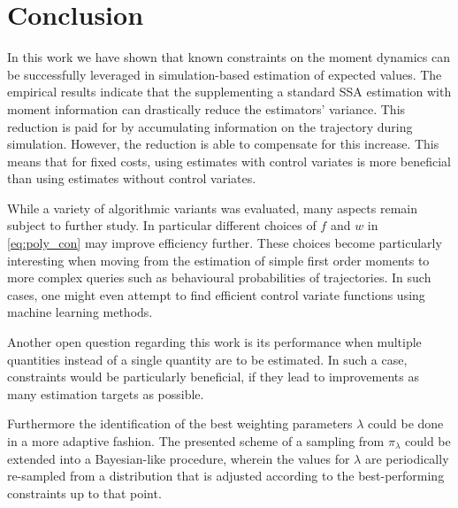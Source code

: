 \section{Conclusion}\label{sec:cv:conclusion}
In this work we have shown that known constraints on the moment dynamics can be successfully
leveraged in simulation-based estimation of expected values.
The empirical results indicate that
the supplementing a standard \ac{SSA} estimation with moment information
can drastically reduce the estimators' variance.
This reduction is paid for by accumulating information on the trajectory
during simulation.
However, the reduction is able to compensate for this increase.
This means that for fixed costs, using   estimates with
  control variates is more beneficial than using estimates without control variates.

While a variety of algorithmic variants was evaluated, many aspects remain subject to
further study.
In particular different choices of $f$ and $w$ in \eqref{eq:poly_con} may improve 
efficiency further.
These choices become particularly interesting when moving from the estimation
of simple first order moments to more complex queries such as behavioural probabilities
of trajectories.
In such cases, one might even attempt to find efficient control variate functions
using machine learning methods.

Another open question regarding this work is its performance when multiple
quantities instead of a single quantity are to be estimated. In such
a case, constraints would be particularly beneficial, if they lead
to improvements  as many estimation targets as possible.

Furthermore the identification of the best weighting parameters $\lambda$
could be done in a more adaptive fashion.
The presented scheme of a sampling from $\pi_{\lambda}$ could be extended
into a Bayesian-like procedure, wherein the values for $\lambda$ are periodically
re-sampled from a distribution that is adjusted according to the best-performing
constraints up to that point.


